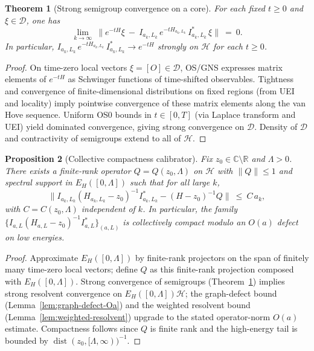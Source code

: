\documentclass[11pt]{amsart}
\theoremstyle{plain}
\newtheorem{theorem}{Theorem}[section]
\newtheorem{proposition}[theorem]{Proposition}
\theoremstyle{definition}
\theoremstyle{remark}
\begin{document}
\begin{theorem}[Strong semigroup convergence on a core]\label{thm:strong-semigroup-core}
For each fixed $t\ge 0$ and $\xi\in\mathcal D$, one has
\[
  \lim_{k\to\infty}\ \big\|e^{-tH}\xi\ -\ I_{a_k,L_k}\,e^{-tH_{a_k,L_k}}\,I_{a_k,L_k}^*\,\xi\big\|\ =\ 0.
\]
In particular, $I_{a_k,L_k}\,e^{-tH_{a_k,L_k}}\,I_{a_k,L_k}^*\to e^{-tH}$ strongly on $\mathcal H$ for each $t\ge 0$.
\end{theorem}
\begin{proof}
On time-zero local vectors $\xi=[O]\in\mathcal D$, OS/GNS expresses matrix elements of $e^{-tH}$ as Schwinger functions of time-shifted observables. Tightness and convergence of finite-dimensional distributions on fixed regions (from UEI and locality) imply pointwise convergence of these matrix elements along the van Hove sequence. Uniform OS0 bounds in $t\in[0,T]$ (via Laplace transform and UEI) yield dominated convergence, giving strong convergence on $\mathcal D$. Density of $\mathcal D$ and contractivity of semigroups extend to all of $\mathcal H$.
\end{proof}

\begin{proposition}[Collective compactness calibrator]\label{prop:collective-compactness}
Fix $z_0\in\mathbb C\setminus\mathbb R$ and $\Lambda>0$. There exists a finite-rank operator $Q=Q(z_0,\Lambda)$ on $\mathcal H$ with $\|Q\|\le 1$ and spectral support in $E_H([0,\Lambda])$ such that for all large $k$,
\[
  \big\|I_{a_k,L_k}(H_{a_k,L_k}-z_0)^{-1}I_{a_k,L_k}^* - (H-z_0)^{-1}Q\big\|\ \le\ C\,a_k,
\]
with $C=C(z_0,\Lambda)$ independent of $k$. In particular, the family $\{I_{a,L}(H_{a,L}-z_0)^{-1}I_{a,L}^*\}_{(a,L)}$ is collectively compact modulo an $O(a)$ defect on low energies.
\end{proposition}
\begin{proof}
Approximate $E_H([0,\Lambda])$ by finite-rank projectors on the span of finitely many time-zero local vectors; define $Q$ as this finite-rank projection composed with $E_H([0,\Lambda])$. Strong convergence of semigroups (Theorem~\ref{thm:strong-semigroup-core}) implies strong resolvent convergence on $E_H([0,\Lambda])\mathcal H$; the graph-defect bound (Lemma~\ref{lem:graph-defect-Oa}) and the weighted resolvent bound (Lemma~\ref{lem:weighted-resolvent}) upgrade to the stated operator-norm $O(a)$ estimate. Compactness follows since $Q$ is finite rank and the high-energy tail is bounded by $\operatorname{dist}(z_0,[\Lambda,\infty))^{-1}$.
\end{proof}
\end{document}
